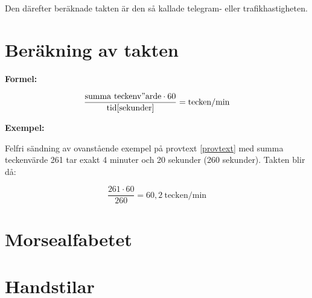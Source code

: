 Den därefter beräknade takten är den så kallade telegram- eller trafikhastigheten.

\section[Taktberäkning]{Beräkning av takten}

\textbf{Formel:}

$$\frac{\mathrm{summa\ teckenv"arde }\cdot 60}{\mathrm{tid} [\mathrm{sekunder}]}
= \mathrm{tecken/min}$$

\textbf{Exempel:}

Felfri sändning av ovanstående exempel på provtext \ref{provtext} med summa
teckenvärde 261 tar exakt 4 minuter och 20 sekunder (260 sekunder).
Takten blir då:

$$\frac{261 \cdot 60}{260} = 60,2\ \mathrm{tecken/min}$$

\section{Morsealfabetet}
\label{morsealfabetet}


\section{Handstilar}
\label{handstilar}

